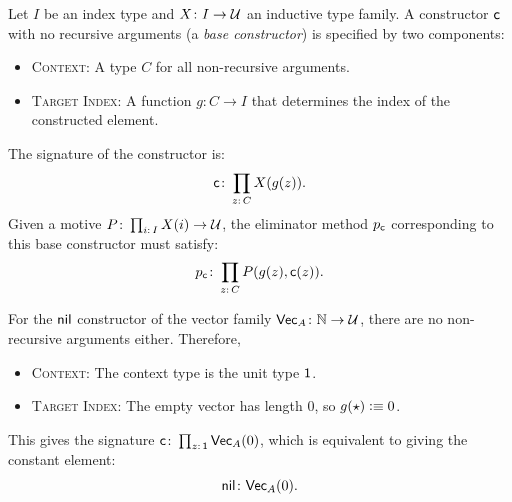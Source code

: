 \begin{defn}\label{defn:no-recursive-args}
    Let $I$ be an index type and $X\colon I\to\univ$ an inductive type family. A constructor $\mathsf{c}$ with no recursive arguments (a \textsl{base constructor}) is specified by two components:
    \begin{itemize}
        \item \textsc{Context:} A type $C$ for all non-recursive arguments.
        
        \item \textsc{Target Index:} A function $g\colon C\to I$ that determines the index of the constructed element.
    \end{itemize}
    The signature of the constructor is:
    \begin{equation}\label{eq:no-recursive-args}
        \fun c\colon\prod_{z\colon C}X(g(z)).
    \end{equation}
    Given a motive $P\colon\prod_{i\colon I}X(i)\to\univ$, the eliminator method $p_{\mathsf{c}}$ corresponding to this base constructor must satisfy:
    \[
        p_{\fun c}\colon\prod_{z\colon C}
            P(g(z),\fun c(z)).
    \]
\end{defn}


\begin{xmpl}
    For the $\mathsf{nil}$ constructor of the vector family $\fun{Vec}_A\colon\N\to\univ$, there are no non-recursive arguments either. Therefore, 
    \begin{itemize}
        \item \textsc{Context:} The context type is the unit type $\mathsf{1}$.
        
        \item \textsc{Target Index:} The empty vector has length $0$, so $g({\mathsf{\star}})\mathrel{\vcentcolon}\equiv0$.
    \end{itemize}
    This gives the signature $\fun c\colon\prod_{z\colon\fun1}\fun{Vec}_A(0)$, which is equivalent to giving the constant element:
    \[
        \fun{nil}\colon\fun{Vec}_A(0).
    \]
\end{xmpl}

